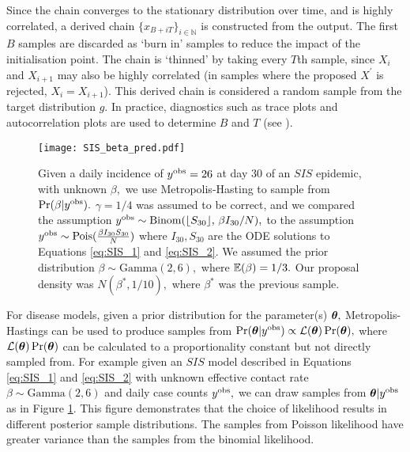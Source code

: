 Since the chain converges to the stationary distribution over time, and is
highly correlated,
a derived chain $\{x_{B + iT}\}_{i \in \mathbb{N}}$ is constructed
from the output. The
first $B$ samples are discarded as `burn in' samples to reduce the impact
of the initialisation point. The chain is `thinned' by taking every $T$th sample,
since $X_i$ and $X_{i + 1}$ may also be highly correlated (in samples where
the proposed $X^\prime$ is rejected, $X_i = X_{i + 1}$).
This derived chain is considered a
random sample from the target distribution $g.$
In practice, diagnostics such as trace plots and autocorrelation plots are used
to determine $B$ and $T$ (see
\cite[Chapter 11]{gelman_bayesian_2014}).

\begin{figure}[htbp]
    \centering
    \texttt{[image: SIS\_beta\_pred.pdf]}
    \caption[{
        Metropolis-Hastings samples from the posterior distribution of $\beta$
        in an $SIS$ model given incidence data
    }]{
        Given a daily incidence of $y^{\mathrm{obs}} = 26$ at day 30 of an $SIS$ epidemic,
        with unknown $\beta,$ we use Metropolis-Hasting to
        sample from $\Pr(\beta | y^{\mathrm{obs}}).$
        $\gamma = 1/4$ was assumed to be correct, and we compared the assumption
        $y^{\mathrm{obs}}
            \sim \mathrm{Binom}(\lfloor S_{30} \rfloor,\, \beta I_{30}/N),$
        to the assumption $y^{\mathrm{obs}} \sim \operatorname{Pois}(\frac{\beta I_{30} S_{30}}{N})$
        where $I_{30}, S_{30}$ are the ODE solutions to Equations
        \ref{eq:SIS_1} and \ref{eq:SIS_2}. We assumed the prior distribution
        $\beta\sim \mathrm{Gamma}(2, 6),$ where $\operatorname{\mathbb{E}}(\beta) = 1/3.$ Our proposal
        density was $N(\beta^\ast, 1/10),$ where $\beta^\ast$ was the previous
        sample.
    }
    \label{fig:SIS_MH_R}
\end{figure}

For disease models, given a prior distribution for the parameter(s) $\bm{\theta},$
Metropolis-Hastings can be used to produce samples from
$\Pr(\bm{\theta} | y^{\mathrm{obs}}) \propto \mathcal{L}(\bm{\theta})\Pr(\bm{\theta}),$ where
$\mathcal{L}(\bm{\theta})\Pr(\bm{\theta})$ can be calculated to a proportionality
constant but not directly
sampled from. For example given an $SIS$ model described in Equations
\ref{eq:SIS_1} and \ref{eq:SIS_2} with unknown effective contact rate
$\beta \sim \mathrm{Gamma}(2, 6)$ and daily case counts $y^{\mathrm{obs}},$ we can
draw samples from $\bm{\theta} | y^{\mathrm{obs}}$ as in Figure \ref{fig:SIS_MH_R}. This
figure demonstrates that the choice of likelihood results in different posterior
sample distributions. The samples from Poisson likelihood have greater variance
than the samples from the binomial likelihood.

